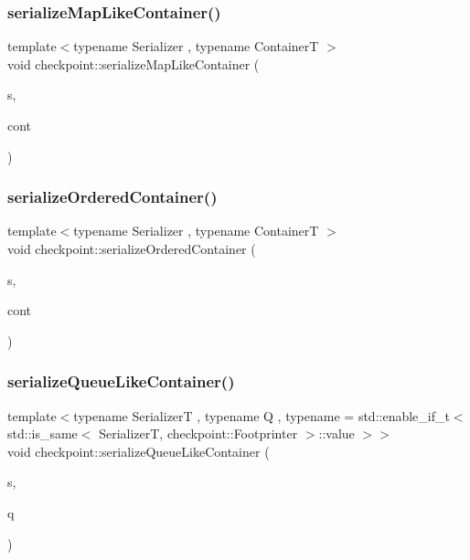 \subsubsection{\texorpdfstring{serialize\+Map\+Like\+Container()}{serializeMapLikeContainer()}}
{\footnotesize\ttfamily template$<$typename Serializer , typename ContainerT $>$ \\
void checkpoint\+::serialize\+Map\+Like\+Container (\begin{DoxyParamCaption}\item[{\hyperlink{structcheckpoint_1_1_serializer}{Serializer} \&}]{s,  }\item[{ContainerT \&}]{cont }\end{DoxyParamCaption})\hspace{0.3cm}{\ttfamily [inline]}}

\mbox{\label{namespacecheckpoint_a0b15edc50a881e06260e7112b2c60742}} 
\subsubsection{\texorpdfstring{serialize\+Ordered\+Container()}{serializeOrderedContainer()}}
{\footnotesize\ttfamily template$<$typename Serializer , typename ContainerT $>$ \\
void checkpoint\+::serialize\+Ordered\+Container (\begin{DoxyParamCaption}\item[{\hyperlink{structcheckpoint_1_1_serializer}{Serializer} \&}]{s,  }\item[{ContainerT \&}]{cont }\end{DoxyParamCaption})\hspace{0.3cm}{\ttfamily [inline]}}

\mbox{\label{namespacecheckpoint_a33956387419a85cfe810fbce88f5bdf9}} 
\subsubsection{\texorpdfstring{serialize\+Queue\+Like\+Container()}{serializeQueueLikeContainer()}}
{\footnotesize\ttfamily template$<$typename SerializerT , typename Q , typename  = std\+::enable\+\_\+if\+\_\+t$<$    std\+::is\+\_\+same$<$      Serializer\+T,      checkpoint\+::\+Footprinter    $>$\+::value  $>$$>$ \\
void checkpoint\+::serialize\+Queue\+Like\+Container (\begin{DoxyParamCaption}\item[{SerializerT \&}]{s,  }\item[{const Q \&}]{q }\end{DoxyParamCaption})}

